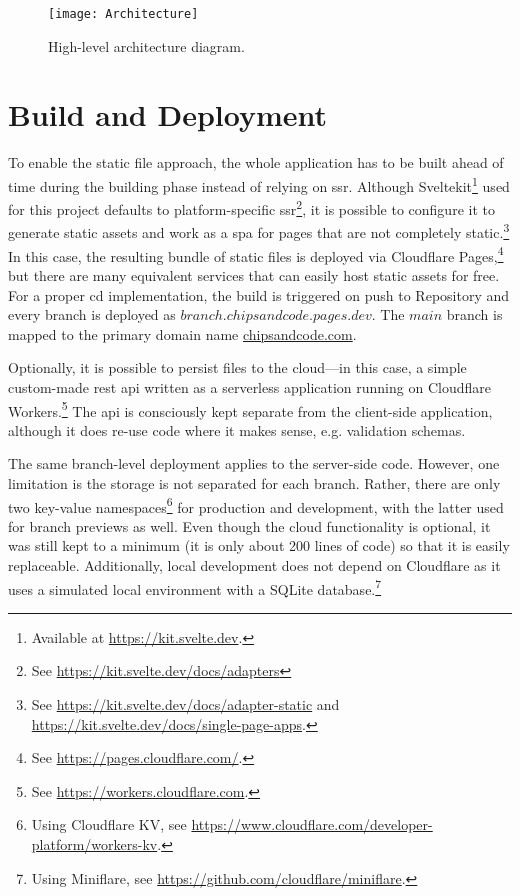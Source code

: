 \begin{figure}[H]
    \centering
    \texttt{[image: Architecture]}
    \caption{High-level architecture diagram.}
    \label{fig:design-architecture}
\end{figure}

\section{Build and Deployment}

To enable the static file approach, the whole application has to be built ahead of time during the building phase instead of relying on \gls{ssr}.
Although Sveltekit\footnote{Available at \url{https://kit.svelte.dev}.} used for this project defaults to platform-specific \gls{ssr}\footnote{See \url{https://kit.svelte.dev/docs/adapters}}, it is possible to configure it to generate static assets and work as a \gls{spa} for pages that are not completely static.\footnote{See \url{https://kit.svelte.dev/docs/adapter-static} and \url{https://kit.svelte.dev/docs/single-page-apps}.}
In this case, the resulting bundle of static files is deployed via Cloudflare Pages,\footnote{See \url{https://pages.cloudflare.com/}.} but there are many equivalent services that can easily host static assets for free.
For a proper \gls{cd} implementation, the build is triggered on push to Repository and every branch is deployed as $branch.chipsandcode.pages.dev$.
The $main$ branch is mapped to the primary domain name \href{https://chipsandcode.com/}{chipsandcode.com}.

Optionally, it is possible to persist files to the cloud---in this case, a simple custom-made \gls{rest} \gls{api} written as a serverless application running on Cloudflare Workers.\footnote{See \url{https://workers.cloudflare.com}.}
The \gls{api} is consciously kept separate from the client-side application, although it does re-use code where it makes sense, e.g. validation schemas.

The same branch-level deployment applies to the server-side code.
However, one limitation is the storage is not separated for each branch.
Rather, there are only two key-value namespaces\footnote{Using Cloudflare KV, see \url{https://www.cloudflare.com/developer-platform/workers-kv}.} for production and development, with the latter used for branch previews as well.
Even though the cloud functionality is optional, it was still kept to a minimum (it is only about 200 lines of code) so that it is easily replaceable.
Additionally, local development does not depend on Cloudflare as it uses a simulated local environment with a SQLite database.\footnote{Using Miniflare, see \url{https://github.com/cloudflare/miniflare}.}


